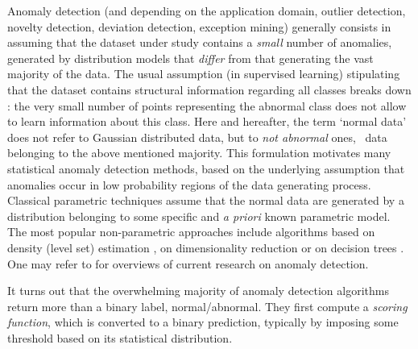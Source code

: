 Anomaly detection (and depending on the application domain, outlier detection, novelty detection, deviation detection, exception mining) generally consists in assuming that the dataset under study contains a \textit{small} number of anomalies, generated by distribution models that  \textit{differ} from that generating the vast majority of the data.
%
The usual assumption (in supervised learning) stipulating that the dataset contains structural information regarding all classes breaks down \cite{Roberts99}: %
the very small number of points representing the abnormal class does not allow to learn information about this class. Here and hereafter, the term `normal data' does not refer to Gaussian distributed data, but  to  \emph{not abnormal} ones, \ie~data belonging to the above mentioned majority. 
This formulation motivates many statistical anomaly detection methods, based on the underlying assumption that anomalies occur in low probability regions of the data generating process. 
Classical parametric techniques \cite{Barnett94, Eskin2000} assume that the normal data are generated by a distribution belonging to some  specific and \emph{a priori} known parametric model.  
The most popular non-parametric approaches include algorithms based on density (level set) estimation \cite{Scholkopf2001, Scott2006, Breunig2000LOF}, on dimensionality reduction \cite{Shyu2003, Aggarwal2001} or on decision trees \cite{Liu2008}.
One may refer to \cite{Hodge2004survey, Chandola2009survey, Patcha2007survey, Markou2003survey} for overviews of current research on anomaly detection.

It turns out that the overwhelming majority of anomaly detection algorithms return more than a binary label, normal/abnormal. They first compute a \emph{scoring function}, which is converted to a binary prediction, typically by imposing some threshold based on its statistical distribution.

